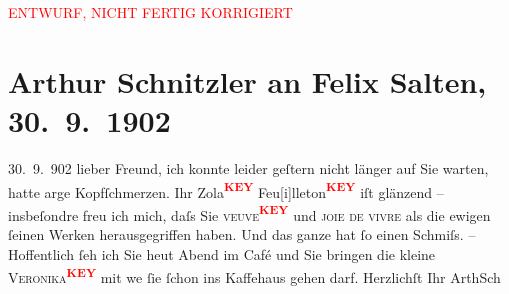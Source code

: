 
\begin{center}
            \textcolor{red}{ENTWURF, NICHT FERTIG KORRIGIERT}
                      \end{center}
            
         
         \renewcommand{\erwaehntePersonen}{Personen: Felix Salten}
         \renewcommand{\erwaehnteOrte}{Orte: Wien}
         \renewcommand{\erwaehnteWerke}{}
               \section[Arthur Schnitzler an Felix Salten, 30. 9. 1902]{ Arthur Schnitzler an Felix Salten, 30. 9. 1902}\nopagebreak{}\rehead{ }\begin{ledgroupsized}[t]{13cm}\normalsize\beginnumbering \toendnotes[C]{\smallbreak\pagebreak[2]} 
\toendnotes[C]{\smallbreak}\pstart
           \raggedleft{}{\pb}30. 9. 902\pend
           \pstart{}lieber Freund,\pend\pstart
           ich konnte leider geſtern nicht länger auf Sie warten, hatte arge Kopfſchmerzen. Ihr
               Zola\textcolor{red}{\textsuperscript{\textbf{KEY}}} Feu{[}i{]}lleton\textcolor{red}{\textsuperscript{\textbf{KEY}}} iſt
               glänzend – insbeſondre freu {\pb}ich
               mich, daſs Sie \textsc{veuve\textcolor{red}{\textsuperscript{\textbf{KEY}}}} und \textsc{joie de vivre} als die ewigen ſeinen Werken
               herausgegriffen haben. Und das ganze hat ſo einen Schmiſs. \pend
           \pstart
           – Hoffentlich ſeh ich Sie heut Abend im Café und Sie bringen die kleine \textsc{Veronika\textcolor{red}{\textsuperscript{\textbf{KEY}}}} mit we{\geminationn} ſie ſchon ins Kaffehaus gehen darf.
               Herzlichſt Ihr \pend
           \pstart \spacefill\mbox{ArthSch}\pend{}
         
         \endnumbering{}\end{ledgroupsized}\begin{anhang}\end{anhang}\newcommand{\dateiname}{L02978}\newcommand{\titel}{Arthur Schnitzler an Felix Salten, 30. 9. 1902}\newcommand{\editorInnen}{Martin Anton Müller und Laura Untner}
      
